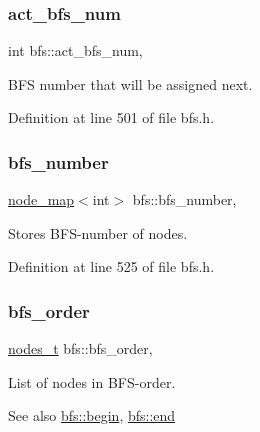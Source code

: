 \subsubsection{\texorpdfstring{act\+\_\+bfs\+\_\+num}{act\_bfs\_num}}
{\footnotesize\ttfamily int bfs\+::act\+\_\+bfs\+\_\+num\hspace{0.3cm}{\ttfamily [protected]}, {\ttfamily [inherited]}}



B\+FS number that will be assigned next. 



Definition at line 501 of file bfs.\+h.

\mbox{\label{classbfs_a59d0c5c5ad2715776b20b1aec03dbc3a}} 
\subsubsection{\texorpdfstring{bfs\+\_\+number}{bfs\_number}}
{\footnotesize\ttfamily \mbox{\hyperlink{classnode__map}{node\+\_\+map}}$<$int$>$ bfs\+::bfs\+\_\+number\hspace{0.3cm}{\ttfamily [protected]}, {\ttfamily [inherited]}}



Stores B\+F\+S-\/number of nodes. 



Definition at line 525 of file bfs.\+h.

\mbox{\label{classbfs_a2596d2cf52f6e7922fd94ce1adde760e}} 
\subsubsection{\texorpdfstring{bfs\+\_\+order}{bfs\_order}}
{\footnotesize\ttfamily \mbox{\hyperlink{edge_8h_a22ac17689106ba21a84e7bc54d1199d6}{nodes\+\_\+t}} bfs\+::bfs\+\_\+order\hspace{0.3cm}{\ttfamily [protected]}, {\ttfamily [inherited]}}



List of nodes in B\+F\+S-\/order. 

\begin{DoxySeeAlso}{See also}
\mbox{\hyperlink{classbfs_aff214e6d33f7f2bbd899cf335540def9}{bfs\+::begin}}, \mbox{\hyperlink{classbfs_ac35b3d3c37d33eb80adb752e17a60df9}{bfs\+::end}} 
\end{DoxySeeAlso}


